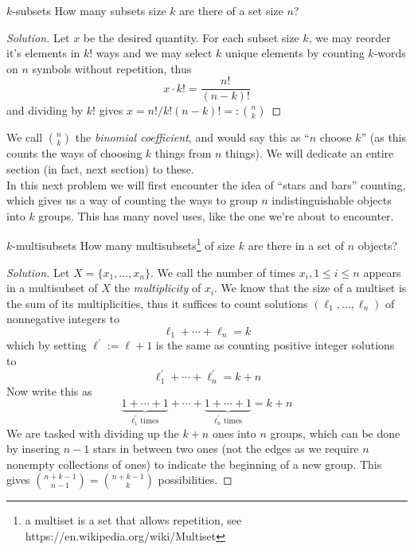 \documentclass{article}
\begin{document}
\begin{problem}[]{$k$-subsets}
    How many subsets size $k$ are there of a set size $n$?
\end{problem}

\begin{proof}[Solution]
    Let $x$ be the desired quantity. For each subset size $k$, we may reorder it's elements in $k!$ ways and we 
    may select $k$ unique elements by counting $k$-words on $n$ symbols without repetition, thus 
    \[x \cdot k! = \frac{n!}{(n-k)!}\] and dividing by $k!$ gives $x = n!/k!(n-k)! =: \binom{n}{k}$
\end{proof}

We call $\binom{n}{k}$ the {\it binomial coefficient}, and would say this as ``$n$ choose $k$'' (as this counts the ways of 
choosing $k$ things from $n$ things). We will dedicate an entire section (in fact, next section) to these. \\ 

In this next problem we will first encounter the idea of ``stars and bars'' counting, which gives us a way of counting 
the ways to group $n$ indistinguishable objects into $k$ groups. This has many novel uses, like the one we're 
about to encounter. 

\begin{problem}[]{$k$-multisubsets}
    How many multisubsets\footnote{a multiset is a set that allows repetition, see https://en.wikipedia.org/wiki/Multiset} of size $k$ are there
    in a set of $n$ objects?
\end{problem}

\begin{proof}[Solution]
    Let $X = \{x_1, \dots, x_n\}$. We call the number of times $x_i, 1 \leq i \leq n$ appears in a multisubset of $X$ the {\it multiplicity} of $x_i$.
    We know that the size of a multiset is the sum of its multiplicities, thus it suffices to count solutions $(\ell_1, \dots, \ell_n)$ of 
    nonnegative integers to 
    \[\ell_1 + \cdots + \ell_n = k\] 
    which by setting $\ell^\prime := \ell + 1$ is the same as counting positive integer solutions to 
    \[\ell^\prime_1 + \cdots + \ell^\prime_n = k + n\] Now write this as \[\underbrace{1 + \cdots + 1}_{\ell_1^\prime \text{ times}} + 
    \cdots + \underbrace{1 + \cdots + 1}_{\ell_n^\prime \text{ times}} = k + n\]
    We are tasked with dividing up the $k + n$ ones into $n$ groups, which can be done by insering $n-1$ stars in between two ones (not the edges
    as we require $n$ nonempty collections of ones) to indicate the beginning of a new group. This gives $\binom{n+k-1}{n-1} = \binom{n+k-1}{k}$
    possibilities.
\end{proof}
\end{document}
